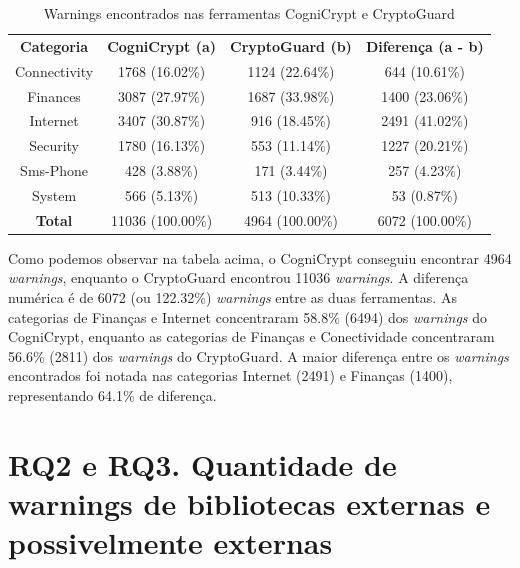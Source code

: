 \begin{table}[!htbp]
  \centering
  \begin{tabular}{|c|c|c|c|}
  
\textbf{Categoria}   & \textbf{CogniCrypt (a)}   &  \textbf{CryptoGuard (b)}     &  \textbf{Diferença (a - b)} \\ 
Connectivity           & \num{1768} (\num{16.02}\%)  &  \num{1124} (\num{22.64}\%)  & \num{644} (\num{10.61}\%) \\
Finances                &     \num{3087} (\num{27.97}\%)     &     \num{1687} (\num{33.98}\%)     &     \num{1400} (\num{23.06}\%)\\
Internet                 &     \num{3407} (\num{30.87}\%)     &     \num{916} (\num{18.45}\%)     &     \num{2491} (\num{41.02}\%)\\
Security                 &     \num{1780} (\num{16.13}\%)     &     \num{553} (\num{11.14}\%)     &     \num{1227} (\num{20.21}\%)\\
Sms-Phone            &     \num{428} (\num{3.88}\%)     &     \num{171} (\num{3.44}\%)     &     \num{257} (\num{4.23}\%)\\
System                  &     \num{566} (\num{5.13}\%)     &     \num{513} (\num{10.33}\%)     &     \num{53} (\num{0.87}\%)\\
\textbf{Total}                     &     \num{11036} (\num{100.00}\%)     &     \num{4964} (100.00\%)     &     \num{6072} (\num{100.00}\%)\\
\end{tabular}
    
  \caption{Warnings encontrados nas ferramentas CogniCrypt e CryptoGuard}
\label{AplicativosComWarning}
\end{table}

Como podemos observar na tabela acima, o CogniCrypt conseguiu encontrar \num{4964} \textit{warnings}, enquanto o CryptoGuard encontrou \num{11036} \textit{warnings}. A diferença numérica é de \num{6072} (ou \num{122.32}\%) \textit{warnings} entre as duas ferramentas. As categorias de Finanças e Internet concentraram \num{58.8}\% (\num{6494}) dos \textit{warnings} do CogniCrypt, enquanto as categorias de Finanças e Conectividade concentraram \num{56.6}\% (\num{2811}) dos \textit{warnings} do CryptoGuard. A maior diferença entre os \textit{warnings} encontrados foi notada nas categorias Internet (\num{2491}) e Finanças (\num{1400}), representando \num{64.1}\% de diferença.

\section{RQ2 e RQ3. Quantidade de warnings de bibliotecas externas e possivelmente externas}

